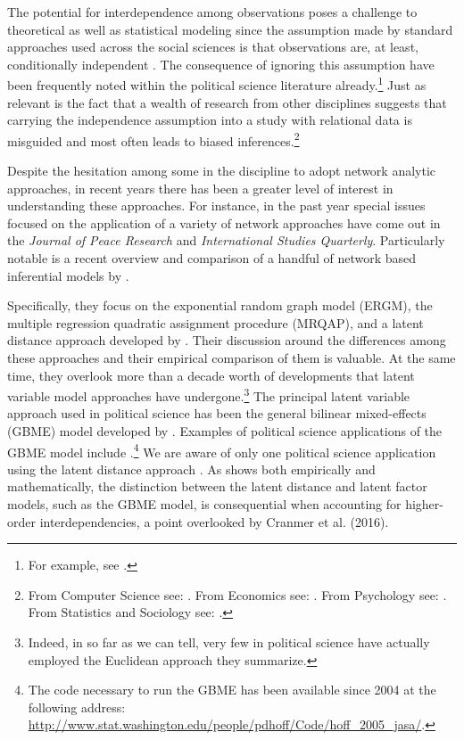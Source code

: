 The potential for interdependence among observations poses a challenge to theoretical as well as statistical modeling since the assumption made by standard approaches used across the social sciences is that observations are, at least, conditionally independent \citep{snijders:2011}. The consequence of ignoring this assumption have been frequently noted within the political science literature already.\footnote{For example, see \citet{beck:etal:1998,signorino:1999,hoff:ward:2004,franzese:hayes:2007,cranmer:desmarais:2011,erikson:pinto:2014}.}  Just as relevant is the fact that a wealth of research from other disciplines suggests that carrying the independence assumption into a study with relational data is misguided and most often leads to biased inferences.\footnote{From Computer Science see: \citet{bonabeau:2002,brandes:erlebach:2005}. From Economics see: \citet{goyal:2012,jackson:2014}. From Psychology see: \citet{pattison:wasserman:1999,kenny:etal:2006}. From Statistics and Sociology see: \citet{snijders:1996,hoff:etal:2002}.} 

Despite the hesitation among some in the discipline to adopt network analytic approaches, in recent years there has been a greater level of interest in understanding these approaches. For instance, in the past year special issues focused on the application of a variety of network approaches have come out in the \textit{Journal of Peace Research} and \textit{International Studies Quarterly}. Particularly notable is a recent overview and comparison of a handful of network based inferential models by \citet{cranmer:etal:2016}.

Specifically, they focus on the exponential random graph model (ERGM), the multiple regression quadratic assignment procedure (MRQAP), and a latent distance approach developed by \citet{hoff:etal:2002}. Their discussion around the differences among these approaches and their empirical comparison of them is valuable. At the same time, they overlook more than a decade worth of developments that latent variable model approaches have undergone.\footnote{Indeed, in so far as we can tell, very few in political science have actually employed the Euclidean approach they summarize.} The principal latent variable approach used in political science has been the general bilinear mixed-effects (GBME) model developed by \citet{hoff:2005}. Examples of political science applications of the GBME model include \citet{hoff:ward:2004,ward:etal:2007,cao:2009,cao:2010, cao:2012,breunig:etal:2012,ward:etal:2012,cao:ward:2014,metternich:etal:2015,greenhill:2015}.\footnote{The code necessary to run the GBME has been available since 2004 at the following address: \url{http://www.stat.washington.edu/people/pdhoff/Code/hoff_2005_jasa/}.} We are aware of only one political science application using the latent distance approach  \citep{kirkland:2012}. As \citet{hoff:2008} shows both empirically and mathematically, the distinction between the latent distance and latent factor models, such as the GBME model, is consequential when accounting for higher-order interdependencies, a point overlooked by Cranmer et al. (2016).

